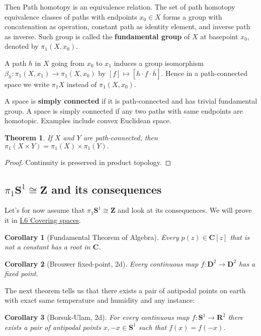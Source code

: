 \documentclass[11pt]{article}
\theoremstyle{definition}
\theoremstyle{plain}
\newtheorem*{corollary}{Corollary}
\newtheorem{theorem}{Theorem}[section]
\theoremstyle{remark}
\newcommand{\R}{\mathbf{R}}
\newcommand{\Z}{\mathbf{Z}}
\newcommand{\C}{\mathbf{C}}
\newcommand{\D}{\mathbf{D}}
\begin{document}
Then Path homotopy is an equivalence relation. The set of path homotopy equivalence classes of paths with endpoints $x_0\in X$ forms a group with concatenation as operation, constant path as identity element, and inverse path as inverse. Such group is called the \textbf{fundamental group} of $X$ at basepoint $x_0$, denoted by $\pi_1(X,x_0)$.\medbreak

A path $h$ in $X$ going from $x_0$ to $x_1$ induces a group isomorphism $\beta_h:\pi_1(X,x_1)\to\pi_1(X,x_0)$ by $[f]\mapsto[h\cdot f\cdot\overline{h}]$. Hence in a path-connected space we write $\pi_1X$ instead of $\pi_1(X,x_0)$.
\medbreak

A space is \textbf{simply connected} if it is path-connected and has trivial fundamental group. A space is simply connected if any two paths with same endpoints are homotopic. Examples include convex Euclidean space.

\begin{theorem}
If $X$ and $Y$ are path-connected, then $\pi_1(X\times Y)=\pi_1(X)\times \pi_1(Y).$
\end{theorem}
\begin{proof}
Continuity is preserved in product topology.
\end{proof}

\subsection{$\pi_1\mathbf{S}^1\cong\Z$ and its consequences}\label{4}

Let's for now assume that $\pi_1\mathbf{S}^1\cong\Z$ and look at its consequences. We will prove it in \hyperref[8]{I.6 Covering spaces}.

\begin{corollary}[Fundamental Theorem of Algebra]
Every $p(z)\in\C[z]$ that is not a constant has a root in $\C$.
\end{corollary}

\begin{corollary}[Brouwer fixed-point, 2d]
Every continuous map $f:\D^2\to\D^2$ has a fixed point.
\end{corollary}

The next theorem tells us that there exists a pair of antipodal points on earth with exact same temperature and humidity and any instance:

\begin{corollary}[Borsuk-Ulam, 2d]
For every continuous map $f:\mathbf{S}^1\to\R^2$ there exists a pair of antipodal points $x,-x\in\mathbf{S}^1$ such that $f(x)=f(-x)$.
\end{corollary}
\end{document}
